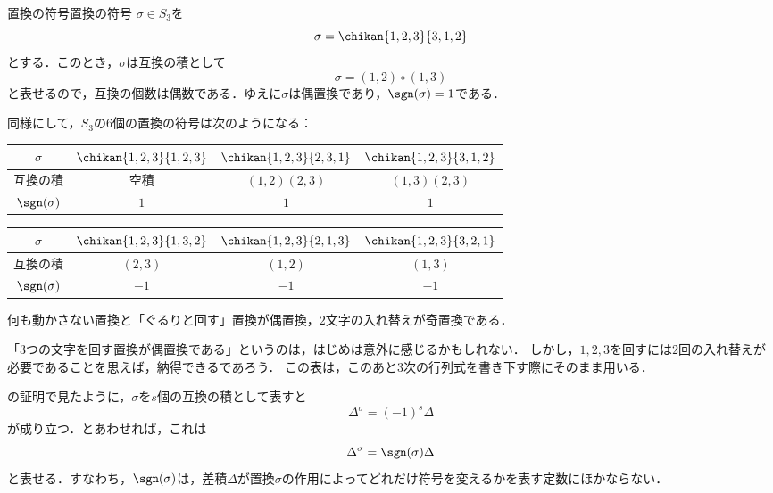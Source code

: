 \begin{example}{置換の符号}{置換の符号}
  $\sigma \in S_3$を
  \[
  \sigma = \chikan{1, 2, 3}{3, 1, 2}
  \]
  とする．このとき，$\sigma$は互換の積として
  \[
  \sigma = (1, 2) \circ (1, 3)
  \]
  と表せるので，互換の個数は偶数である．ゆえに$\sigma$は偶置換であり，$\sgn(\sigma) = 1$である．

  同様にして，$S_3$の$6$個の置換の符号は次のようになる：
  \begin{center}
    \renewcommand{\arraystretch}{0.75}
    \newcommand{\chikanstrut}{\rule[-1.4em]{0pt}{3.4em}}
    \newcommand{\rowstrut}{\rule[-0.6em]{0pt}{1.8em}}
    \begin{tabular}{c|ccc}
      $\sigma$\chikanstrut
        & $\chikan{1,2,3}{1,2,3}$ & $\chikan{1,2,3}{2,3,1}$ & $\chikan{1,2,3}{3,1,2}$ \\ \hline
      互換の積\rowstrut & 空積 & $(1,2)(2,3)$ & $(1,3)(2,3)$ \\
      $\sgn(\sigma)$\rowstrut & $1$ & $1$ & $1$
    \end{tabular}
    \par\medskip
    \begin{tabular}{c|ccc}
      $\sigma$\chikanstrut
        & $\chikan{1,2,3}{1,3,2}$ & $\chikan{1,2,3}{2,1,3}$ & $\chikan{1,2,3}{3,2,1}$ \\ \hline
      互換の積\rowstrut & $(2,3)$ & $(1,2)$ & $(1,3)$ \\
      $\sgn(\sigma)$\rowstrut & $-1$ & $-1$ & $-1$
    \end{tabular}
  \end{center}
  何も動かさない置換と「ぐるりと回す」置換が偶置換，$2$文字の入れ替えが奇置換である．
\end{example}

「$3$つの文字を回す置換が偶置換である」というのは，はじめは意外に感じるかもしれない．
しかし，$1, 2, 3$を回すには$2$回の入れ替えが必要であることを思えば，納得できるであろう．
この表は，このあと$3$次の行列式を書き下す際にそのまま用いる．

の証明で見たように，$\sigma$を$s$個の互換の積として表すと
\[
\Delta^\sigma = (-1)^s \Delta
\]
が成り立つ．とあわせれば，これは
\[
\Delta^\sigma = \sgn(\sigma) \Delta
\]
と表せる．すなわち，$\sgn(\sigma)$は，差積$\Delta$が置換$\sigma$の作用によってどれだけ符号を変えるかを表す定数にほかならない．

